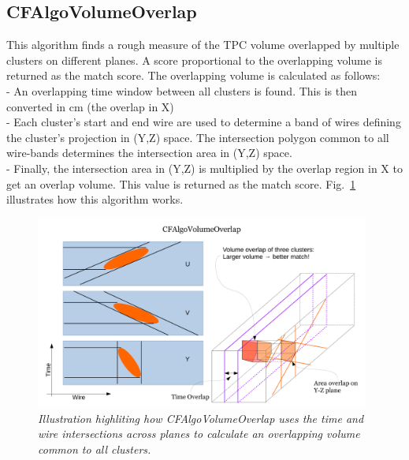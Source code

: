 \documentclass{article}
\begin{document}
\subsection{CFAlgoVolumeOverlap}
This algorithm finds a rough measure of the TPC volume overlapped by multiple clusters on different planes. A score proportional to the overlapping volume
is returned as the match score. The overlapping volume is calculated as follows:\\
- An overlapping time window between all clusters is found. This is then converted in cm (the overlap in X)\\
- Each cluster's start and end wire are used to determine a band of wires defining the cluster's projection in (Y,Z) space. The intersection polygon common
to all wire-bands determines the intersection area in (Y,Z) space.\\
- Finally, the intersection area in (Y,Z) is multiplied by the overlap region in X to get an overlap volume. This value is returned as the match score.
Fig.~\ref{fig:VolumeOverlap} illustrates how this algorithm works.
\begin{figure}[!h]
\begin{center}
\includegraphics[width=110mm]{Figures/MatchAglo_CFAlgoVolumeOverlap_Description.pdf}
\end{center}
\caption{\textit{Illustration highliting how CFAlgoVolumeOverlap uses the time and wire intersections across planes to calculate an overlapping volume
common to all clusters.}}
\label{fig:VolumeOverlap}
\end{figure}

\newpage
\end{document}
